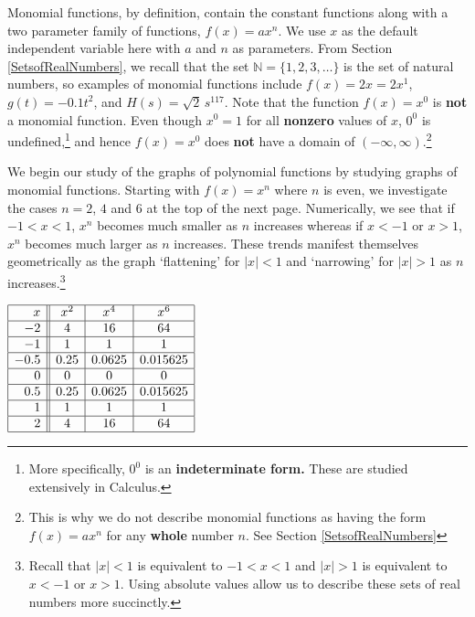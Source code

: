 \documentclass{ximera}
\begin{document}
Monomial functions, by definition, contain the constant functions along with a two parameter family of functions, $f(x) = ax^n$.  We use $x$ as the default independent variable here with $a$ and $n$ as parameters.  From Section \ref{SetsofRealNumbers}, we recall that the set $\mathbb{N} = \{ 1, 2, 3, \ldots \}$ is the set of natural numbers, so examples of monomial functions include $f(x) = 2x = 2x^{1}$, $g(t) = -0.1 t^2$, and $H(s) = \sqrt{2} \, s^{117}$.  Note that the function $f(x) = x^0$ is \textbf{not} a monomial function.  Even though $x^0 = 1$ for all \textbf{nonzero} values of $x$, $0^{0}$ is undefined,\footnote{More specifically, $0^0$ is an \textbf{indeterminate form.}  These are studied extensively in Calculus.} and hence $f(x) = x^0$ does \textbf{not} have a domain of $(-\infty, \infty)$.\footnote{This is why we do not describe monomial functions as having the form $f(x) = ax^n$ for any \textbf{whole} number $n$. See Section \ref{SetsofRealNumbers}}


We begin our study of the graphs of polynomial functions by studying graphs of monomial functions.  Starting with $f(x) = x^n$ where $n$ is even, we investigate the cases $n = 2$, $4$ and $6$ at the top of the next page.  Numerically, we see that if $-1 < x < 1$,  $x^n$ becomes much smaller as $n$ increases whereas if $x<-1$ or $x>1$, $x^n$ becomes much larger as $n$ increases.  These trends manifest themselves geometrically as  the graph `flattening'  for $|x|<1$  and `narrowing'  for $|x| > 1$ as $n$ increases.\footnote{Recall that $|x| < 1$ is equivalent to $-1<x<1$ and $|x|>1$ is equivalent to $x<-1$ or $x>1$.  Using absolute values allow us to describe these sets of real numbers more succinctly.}   


\begin{center}
$\begin{array}{|r||c|c|c|}  \hline
x &  x^2 & x^4 & x^6 \\ \hline
 -2 & 4& 16& 64 \\  \hline
 -1 & 1 & 1&  1\\  \hline
 -0.5 & 0.25 & 0.0625&  0.015625 \\  \hline
 0 &  0 & 0 & 0 \\  \hline
 0.5 & 0.25  &  0.0625 & 0.015625 \\  \hline
 1&  1 & 1&  1 \\  \hline
 2 & 4 & 16 & 64 \\ \hline \end{array}$
\end{center}
\end{document}
